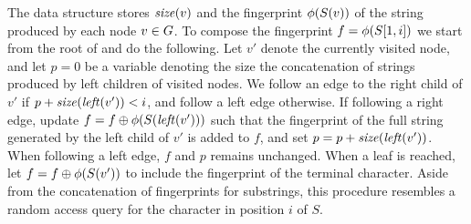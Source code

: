 The data structure stores $\mathit{size}(v)$ and the fingerprint $\phi(S(v))$ of the string produced by each node $v \in G$. To compose the fingerprint $f = \phi(S[1, i])$ we start from the root of \slp and do the following. Let $v'$ denote the currently visited node, and let $p=0$ be a variable denoting the size the concatenation of strings produced by left children of visited nodes. We follow an edge to the right child of $v'$ if $p+\mathit{size}(\mathit{left}(v')) < i$, and follow a left edge otherwise. If following a right edge, update $f = f \oplus \phi(S(\mathit{left}(v')))$ such that the fingerprint of the full string generated by the left child of $v'$ is added to $f$, and set $p = p+\mathit{size}(\mathit{left}(v'))$. When following a left edge, $f$ and $p$ remains unchanged. When a leaf is reached, let $f = f \oplus \phi(S(v'))$ to include the fingerprint of the terminal character. Aside from the concatenation of fingerprints for substrings, this procedure resembles a random access query for the character in position $i$ of $S$.


